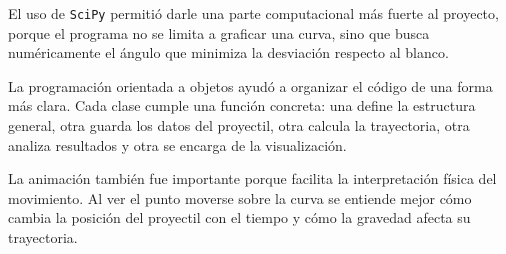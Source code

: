\documentclass[12pt,letterpaper]{article}
\begin{document}
El uso de \texttt{SciPy} permiti\'{o} darle una parte computacional m\'{a}s fuerte al proyecto, porque el programa no se limita a graficar una curva, sino que busca num\'{e}ricamente el \'{a}ngulo que minimiza la desviaci\'{o}n respecto al blanco.

La programaci\'{o}n orientada a objetos ayud\'{o} a organizar el c\'{o}digo de una forma m\'{a}s clara. Cada clase cumple una funci\'{o}n concreta: una define la estructura general, otra guarda los datos del proyectil, otra calcula la trayectoria, otra analiza resultados y otra se encarga de la visualizaci\'{o}n.

La animaci\'{o}n tambi\'{e}n fue importante porque facilita la interpretaci\'{o}n f\'{i}sica del movimiento. Al ver el punto moverse sobre la curva se entiende mejor c\'{o}mo cambia la posici\'{o}n del proyectil con el tiempo y c\'{o}mo la gravedad afecta su trayectoria.
\end{document}

